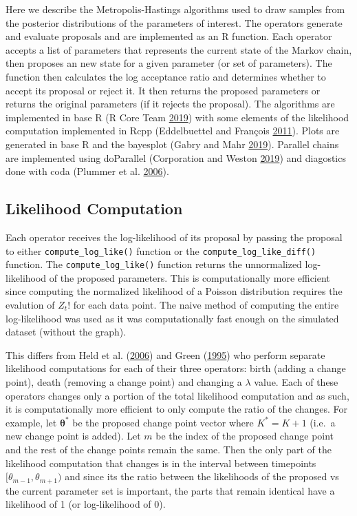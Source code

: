 \documentclass[11pt,a4paper]{article}
\begin{document}
Here we describe the Metropolis-Hastings algorithms used to draw samples
from the posterior distributions of the parameters of interest. The
operators generate and evaluate proposals and are implemented as an R
function. Each operator accepts a list of parameters that represents the
current state of the Markov chain, then proposes an new state for a
given parameter (or set of parameters). The function then calculates the
log acceptance ratio and determines whether to accept its proposal or
reject it. It then returns the proposed parameters or returns the
original parameters (if it rejects the proposal). The algorithms are
implemented in base R (R Core Team
\protect\hyperlink{ref-r_core_team_r:_2019}{2019}) with some elements of
the likelihood computation implemented in Rcpp (Eddelbuettel and
François \protect\hyperlink{ref-eddelbuettel_rcpp:_2011}{2011}). Plots
are generated in base R and the bayesplot (Gabry and Mahr
\protect\hyperlink{ref-gabry_bayesplot:_2019}{2019}). Parallel chains
are implemented using doParallel (Corporation and Weston
\protect\hyperlink{ref-corporation_doparallel:_2019}{2019}) and
diagostics done with coda (Plummer et al.
\protect\hyperlink{ref-plummer_coda:_2006}{2006}).

\hypertarget{likelihood-computation}{%
\subsection{Likelihood Computation}\label{likelihood-computation}}

Each operator receives the log-likelihood of its proposal by passing the
proposal to either \texttt{compute\_log\_like()} function or the
\texttt{compute\_log\_like\_diff()} function. The
\texttt{compute\_log\_like()} function returns the unnormalized
log-likelihood of the proposed parameters. This is computationally more
efficient since computing the normalized likelihood of a Poisson
distribution requires the evalution of \(Z_{t}!\) for each data point.
The naive method of computing the entire log-likelihood was used as it
was computationally fast enough on the simulated dataset (without the
graph).

This differs from Held et al.
(\protect\hyperlink{ref-held_two-component_2006}{2006}) and Green
(\protect\hyperlink{ref-green_reversible_1995}{1995}) who perform
separate likelihood computations for each of their three operators:
birth (adding a change point), death (removing a change point) and
changing a \(\lambda\) value. Each of these operators changes only a
portion of the total likelihood computation and as such, it is
computationally more efficient to only compute the ratio of the changes.
For example, let \(\boldsymbol{\theta^*}\) be the proposed change point
vector where \(K^* = K + 1\) (i.e.~a new change point is added). Let
\(m\) be the index of the proposed change point and the rest of the
change points remain the same. Then the only part of the likelihood
computation that changes is in the interval between timepoints
\([\theta_{m-1}, \theta_{m+1})\) and since its the ratio between the
likelihoods of the proposed vs the current parameter set is important,
the parts that remain identical have a likelihood of 1 (or
log-likelihood of 0).
\end{document}
